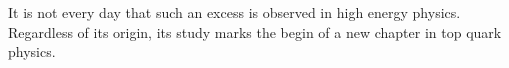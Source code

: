 
\smallskip

It is not every day that such an excess is observed in high energy physics. Regardless of its origin, its study marks the begin of a new chapter in top quark physics.

